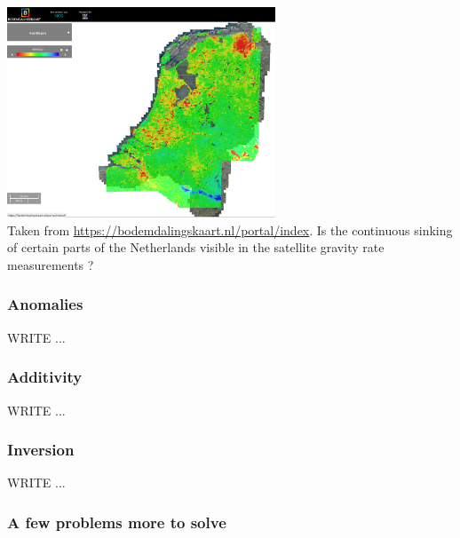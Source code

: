 \begin{center}
\includegraphics[width=8cm]{images/gravity/bodemdaling}\\
{\captionfont Taken from \url{https://bodemdalingskaart.nl/portal/index}. Is the continuous sinking of certain parts of the Netherlands 
visible in the satellite gravity rate measurements ?}
\end{center}

\subsubsection{Anomalies}

WRITE ...

\subsubsection{Additivity}

WRITE ...

\subsubsection{Inversion}

WRITE ...






\subsubsection{A few problems more to solve}

